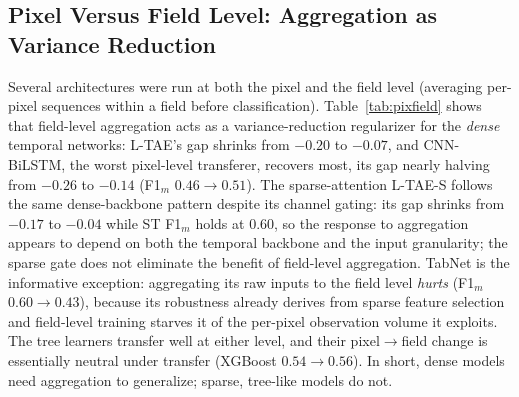 \documentclass[journal]{IEEEtran}
\begin{document}
\subsection{Pixel Versus Field Level: Aggregation as Variance Reduction}
\label{sec:pixfield}
Several architectures were run at both the pixel and the field level (averaging per-pixel sequences within a field before classification). Table~\ref{tab:pixfield} shows that field-level aggregation acts as a variance-reduction regularizer for the \emph{dense} temporal networks: L-TAE's gap shrinks from $-0.20$ to $-0.07$, and CNN-BiLSTM, the worst pixel-level transferer, recovers most, its gap nearly halving from $-0.26$ to $-0.14$ (F1$_m$ $0.46\rightarrow0.51$). The sparse-attention L-TAE-S follows the same dense-backbone pattern despite its channel gating: its gap shrinks from $-0.17$ to $-0.04$ while ST F1$_m$ holds at $0.60$, so the response to aggregation appears to depend on both the temporal backbone and the input granularity; the sparse gate does not eliminate the benefit of field-level aggregation. TabNet is the informative exception: aggregating its raw inputs to the field level \emph{hurts} (F1$_m$ $0.60\rightarrow0.43$), because its robustness already derives from sparse feature selection and field-level training starves it of the per-pixel observation volume it exploits. The tree learners transfer well at either level, and their pixel$\rightarrow$field change is essentially neutral under transfer (XGBoost $0.54\rightarrow0.56$). In short, dense models need aggregation to generalize; sparse, tree-like models do not.
\end{document}
